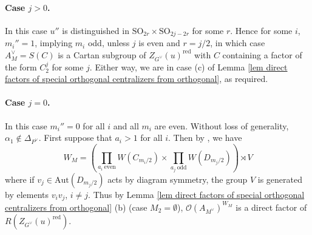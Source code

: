 \documentclass[10pt]{article}
\newcommand{\Oo}{\mathcal{O}}
\newcommand{\GL}{\mathrm{GL}}
\newcommand{\SO}{\mathrm{SO}}
\newcommand{\OO}{\mathrm{O}}
\newcommand{\Aut}{\mathrm{Aut}}
\theoremstyle{definition}
\theoremstyle{remark}
\newcommand{\Zur}{Z_{G^\vee}(u)^{\mathrm{red}}}
\begin{document}
\paragraph{Case $j>0$.}
In this case $u''$ is distinguished in $\SO_{2r}\times\SO_{2j-2r}$ for some $r$. 
Hence for some $i$, $m_i''=1$, implying $m_i$ odd, unless $j$ is even and $r=j/2$, in which 
case $A_M^\vee=S(C)$ is a Cartan subgroup of $\Zur$ with $C$ containing a factor of the form $C_2^j$
for some $j$. Either way, we are  in case (c) of Lemma \ref{lem direct factors of special orthogonal centralizers from orthogonal}, as required.
%
\paragraph{Case $j=0$.}
In this case $m_i''=0$ for all $i$ and all $m_i$ are even. Without loss of generality, 
$\alpha_1\not\in\Delta_{P^\vee}$. First suppose that $a_i>1$ for all $i$. Then by
\cite[p.73, Case 2(iii)]{Howlett}, we have 
%
\[
W_M=\left(\prod_{a_i~\text{even}}W(C_{m_i/2})\times\prod_{a_j~\text{odd}}W(D_{m_j/2})\right)\rtimes V
\]
%
where if $v_j\in\Aut(D_{m_j/2})$ acts by diagram symmetry, the group $V$ is generated by elements 
$v_iv_j$, $i\neq j$. Thus by Lemma \ref{lem direct factors of special orthogonal centralizers from 
orthogonal} (b) (case $M_2=\emptyset$), $\Oo(A_{M^\vee})^{W_M}$ is a direct factor of $R(\Zur)$.
\end{document}

